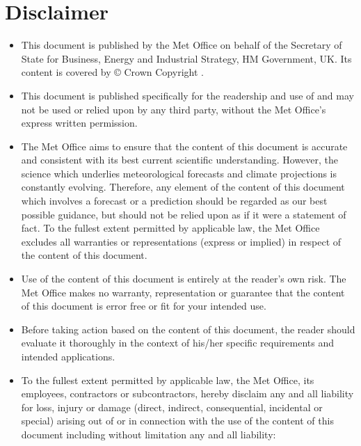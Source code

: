 
\section*{Disclaimer}

\begin{itemize}
\item This document is published by the Met Office on behalf of the
  Secretary of State for Business, Energy and Industrial Strategy, HM
  Government, UK. Its content is covered by {\copyright} Crown
  Copyright {\number\year}.
 
\item This document is published specifically for the readership and
  use of {\CustomerName} and may not be used or relied upon by any
  third party, without the Met Office's express written permission.
 
\item The Met Office aims to ensure that the content of this document
  is accurate and consistent with its best current scientific
  understanding.  However, the science which underlies meteorological
  forecasts and climate projections is constantly evolving.
  Therefore, any element of the content of this document which
  involves a forecast or a prediction should be regarded as our best
  possible guidance, but should not be relied upon as if it were a
  statement of fact.  To the fullest extent permitted by applicable
  law, the Met Office excludes all warranties or representations
  (express or implied) in respect of the content of this document.
 
\item Use of the content of this document is entirely at the reader's
  own risk. The Met Office makes no warranty, representation or
  guarantee that the content of this document is error free or fit for
  your intended use.
 
\item Before taking action based on the content of this document, the
  reader should evaluate it thoroughly in the context of his/her
  specific requirements and intended applications.
 
\item To the fullest extent permitted by applicable law, the Met
  Office, its employees, contractors or subcontractors, hereby
  disclaim any and all liability for loss, injury or damage (direct,
  indirect, consequential, incidental or special) arising out of or in
  connection with the use of the content of this document including
  without limitation any and all liability:


\end{itemize}
